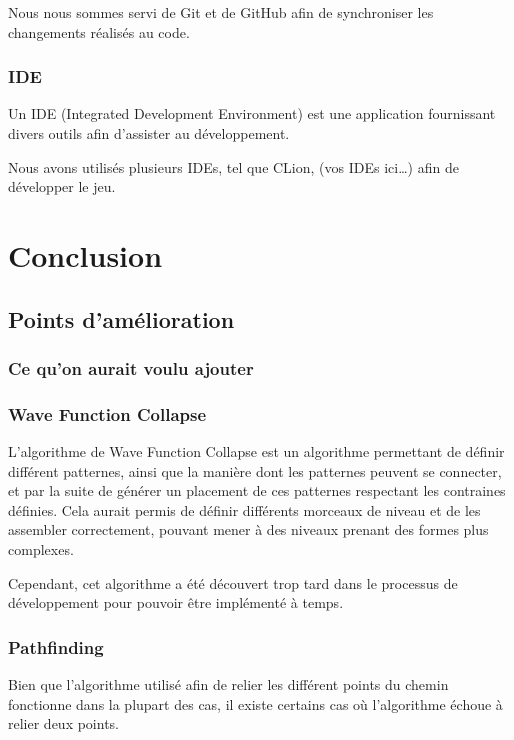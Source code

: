 \documentclass[10pt]{report}
\begin{document}
Nous nous sommes servi de Git et de GitHub afin de synchroniser les changements réalisés au code.

\subsubsection{IDE}

Un IDE (Integrated Development Environment) est une application fournissant divers outils afin d'assister au
développement.

Nous avons utilisés plusieurs IDEs, tel que CLion, (vos IDEs ici\ldots) afin de développer le jeu.

\newpage

\section{Conclusion}
\subsection{Points d'amélioration}
\subsubsection{Ce qu'on aurait voulu ajouter}
\subsubsection{Wave Function Collapse}

L'algorithme de Wave Function Collapse est un algorithme permettant de définir différent patternes, ainsi que la
manière dont les patternes peuvent se connecter, et par la suite de générer un placement de ces patternes respectant
les contraines définies.
Cela aurait permis de définir différents morceaux de niveau et de les assembler correctement, pouvant mener à des
niveaux prenant des formes plus complexes.

Cependant, cet algorithme a été découvert trop tard dans le processus de développement pour pouvoir être implémenté
à temps.

\subsubsection{Pathfinding}

Bien que l'algorithme utilisé afin de relier les différent points du chemin fonctionne dans la plupart des cas, il
existe certains cas où l'algorithme échoue à relier deux points.
\end{document}
